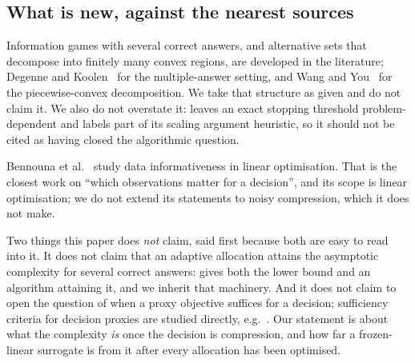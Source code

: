 \subsection{What is new, against the nearest sources}

Information games with several correct answers, and alternative sets that decompose into
finitely many convex regions, are developed in the literature; Degenne and
Koolen~\cite{degenne2019} for the multiple-answer setting, and Wang and
You~\cite{wangyou2026} for the piecewise-convex decomposition. We take that structure as
given and do not claim it. We also do not overstate it: \cite{wangyou2026} leaves an exact
stopping threshold problem-dependent and labels part of its scaling argument heuristic, so
it should not be cited as having closed the algorithmic question.

Bennouna et al.~\cite{bennouna2026} study data informativeness in linear optimisation. That
is the closest work on ``which observations matter for a decision'', and its scope is linear
optimisation; we do not extend its statements to noisy compression, which it does not make.

Two things this paper does \emph{not} claim, said first because both are easy to read into
it. It does not claim that an adaptive allocation attains the asymptotic complexity for
several correct answers: \cite{degenne2019} gives both the lower bound and an algorithm
attaining it, and we inherit that machinery. And it does not claim to open the question of
when a proxy objective suffices for a decision; sufficiency criteria for decision proxies
are studied directly, e.g.~\cite{schutte2026}. Our statement is about what the complexity
\emph{is} once the decision is compression, and how far a frozen-linear surrogate is from
it after every allocation has been optimised.

